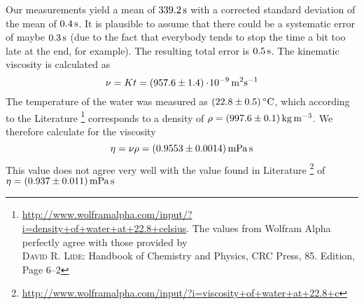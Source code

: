 Our measurements yield a mean of $\unit[339.2]{s}$ with a corrected standard deviation of the mean of $\unit[0.4]{s}$. It is plausible to assume that there could be a systematic error of maybe $\unit[0.3]{s}$ (due to the fact that everybody tends to stop the time a bit too late at the end, for example). The resulting total error is $\unit[0.5]{s}$. The kinematic viscosity is calculated as
\[
    \nu = K t = \unit[(957.6 \pm 1.4)\e{-9}]{m^2 s^{-1}}
\]
The temperature of the water was measured as $(22.8 \pm 0.5)\C$, which according to the Literature%
\footnote{\url{http://www.wolframalpha.com/input/?i=density+of+water+at+22.8+celsius}. The values from Wolfram Alpha perfectly agree with those provided by \\ \textsc{David R. Lide}: Handbook of Chemistry and Physics, CRC Press, 85. Edition, Page 6--2}
corresponds to a density of $\rho = \unit[(997.6 \pm 0.1)]{kg\,m^{-3}}$. We therefore calculate for the viscosity
\[
    \eta =  \nu \rho = \unit[(0.9553 \pm0.0014)]{mPa\,s}
\]
This value does not agree very well with the value found in Literature%
\footnote{\url{http://www.wolframalpha.com/input/?i=viscosity+of+water+at+22.8+c}}
of $\eta = \unit[(0.937 \pm 0.011)]{mPa\, s}$

